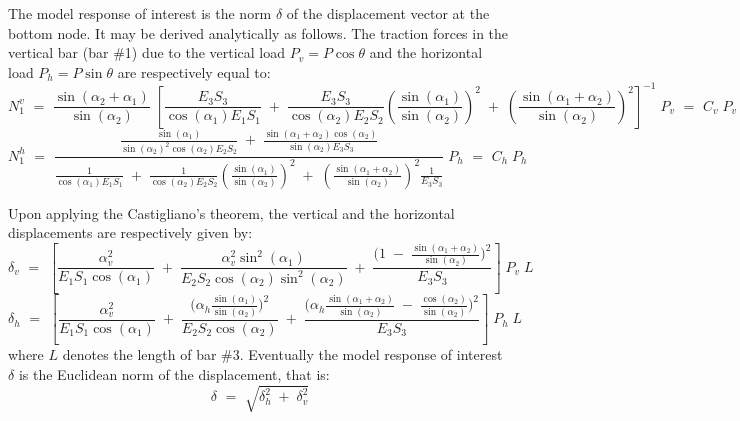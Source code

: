 \documentclass[11pt]{article}
\begin{document}
The model response of interest is the norm $\delta$ of the displacement vector at the bottom node. It may be derived analytically as follows. The traction forces in the vertical bar (bar \#1) due to the vertical load $P_v = P \cos \theta$ and the horizontal load $P_h = P \sin \theta$ are respectively equal to:
\begin{equation}
  N_1^v \, \, = \, \, \frac{\sin(\alpha_2 + \alpha_1)}{\sin(\alpha_2)} \;
  \left[ \frac{E_3 S_3}{\cos(\alpha_1) E_1 S_1} \; + \; \frac{E_3 S_3}{\cos(\alpha_2) E_2 S_2} \left( \frac{\sin(\alpha_1)}{\sin(\alpha_2)}\right)^2 \; + \;
    \left( \frac{\sin(\alpha_1 + \alpha_2)}{\sin(\alpha_2)}\right)^2 \right]^{-1}
  \; P_v \, \, = \, \, C_v \; P_v
\end{equation}
\begin{equation}
  N_1^h \, \, = \, \,
  \frac{ \frac{\sin(\alpha_1)}{\sin(\alpha_2)^2 \cos(\alpha_2) E_2 S_2}  \; + \; \frac{\sin(\alpha_1 + \alpha_2) \cos(\alpha_2)}{\sin(\alpha_2) E_3 S_3}     }
       { \frac{1}{\cos(\alpha_1) E_1 S_1} \; + \; \frac{1}{\cos(\alpha_2) E_2 S_2} \left( \frac{\sin(\alpha_1)}{\sin(\alpha_2)}\right)^2 \; + \;
         \left( \frac{\sin(\alpha_1 + \alpha_2)}{\sin(\alpha_2)}\right)^2  \frac{1}{E_3 S_3} }
       \; P_h \, \, = \, \, C_h \; P_h
\end{equation}

Upon applying the Castigliano's theorem, the vertical and the horizontal displacements are respectively given by:
\begin{equation}
  \delta_v \, \, = \, \,
  \left[ \frac{\alpha_v^2}{E_1 S_1 \cos(\alpha_1)} \; + \; \frac{\alpha_v^2 \sin^2(\alpha_1)}{E_2 S_2 \cos(\alpha_2) \sin^2(\alpha_2)} \; + \;
    \frac{\big( 1 \; - \; \frac{\sin(\alpha_1 + \alpha_2)}{\sin(\alpha_2)}\big)^2}{E_3 S_3}  \right]
  \; P_v \; L
\end{equation}
\begin{equation}
  \delta_h  \, \, = \, \,
  \left[
    \frac{\alpha_v^2}{E_1 S_1 \cos(\alpha_1)} \; + \;  \frac{\big(\alpha_h \frac{\sin(\alpha_1)}{\sin(\alpha_2)}  \big)^2}{E_2 S_2 \cos(\alpha_2)} \; + \;
    \frac{\big(\alpha_h \frac{\sin(\alpha_1 + \alpha_2)}{\sin(\alpha_2)} \; - \; \frac{\cos(\alpha_2)}{\sin(\alpha_2)} \big)^2}{E_3 S_3}
    \right]
  \; P_h \; L
\end{equation}
where $L$ denotes the length of bar \#3. Eventually the model response of interest $\delta$ is the Euclidean norm of the displacement, that is:
\begin{equation}
  \delta \, \, = \, \, \sqrt{\delta_h^2 \; + \; \delta_v^2}
\end{equation}
\end{document}
